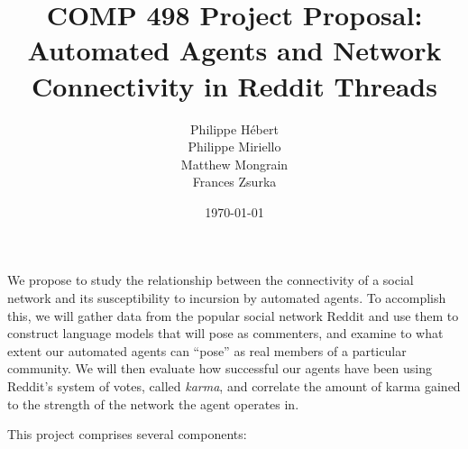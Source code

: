 \documentclass[12pt]{article}
\title{
    COMP 498 Project Proposal: \\
    Automated Agents and Network Connectivity in Reddit Threads
 }
\author{
    Philippe H\'ebert \\
    Philippe Miriello \\
    Matthew Mongrain \\
    Frances Zsurka \\
}
\date{\today}
\begin{document}
    \maketitle
    We propose to study the relationship between the connectivity of a social network and its susceptibility to incursion by automated agents. To accomplish this, we will gather data from the popular social network Reddit and use them to construct language models that will pose as commenters, and examine to what extent our automated agents can ``pose'' as real members of a particular community. We will then evaluate how successful our agents have been using Reddit's system of votes, called \textit{karma}, and correlate the amount of karma gained to the strength of the network the agent operates in.

    This project comprises several components:
\end{document}
